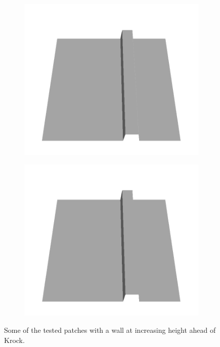 \begin{figure}[H]
\begin{subfigure}[b]{0.24\textwidth}
    \end{subfigure}
    \begin{subfigure}[b]{0.24\textwidth}
    \includegraphics[width=\linewidth]{../img/5/custom_patches/walls_increasing/all/17-3d.png}
    \end{subfigure}
    \begin{subfigure}[b]{0.24\textwidth}
    \includegraphics[width=\linewidth]{../img/5/custom_patches/walls_increasing/all/19-3d.png}
    \end{subfigure}
    \caption{Some of the tested patches with a wall at increasing height ahead of Krock.}
    \end{figure}
